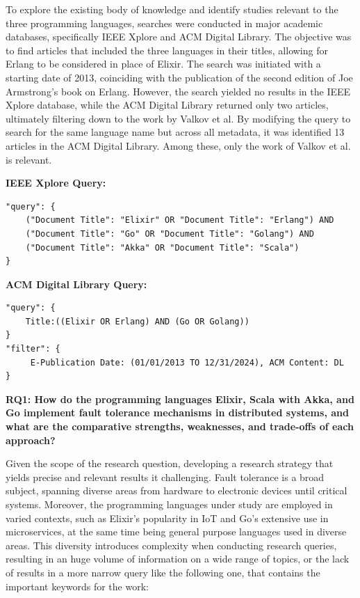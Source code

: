 To explore the existing body of knowledge and identify studies relevant to the three programming languages, searches were conducted in major academic databases, specifically IEEE Xplore and ACM Digital Library. The objective was to find articles that included the three languages in their titles, allowing for Erlang to be considered in place of Elixir. The search was initiated with a starting date of 2013, coinciding with the publication of the second edition of Joe Armstrong's book on Erlang. However, the search yielded no results in the IEEE Xplore database, while the ACM Digital Library returned only two articles, ultimately filtering down to the work by Valkov et al. By modifying the query to search for the same language name but across all metadata, it was identified 13 articles in the ACM Digital Library. Among these, only the work of Valkov et al. \cite{Valkov2018} is relevant.

\textbf{IEEE Xplore Query:}
\begin{verbatim}
"query": { 
    ("Document Title": "Elixir" OR "Document Title": "Erlang") AND
    ("Document Title": "Go" OR "Document Title": "Golang") AND 
    ("Document Title": "Akka" OR "Document Title": "Scala") 
}
\end{verbatim}


\textbf{ACM Digital Library Query:}
\begin{verbatim}
"query": { 
    Title:((Elixir OR Erlang) AND (Go OR Golang)) 
}
"filter": {
     E-Publication Date: (01/01/2013 TO 12/31/2024), ACM Content: DL 
}
\end{verbatim}


\textbf{RQ1: How do the programming languages Elixir, Scala with Akka, and Go implement fault tolerance mechanisms in distributed systems, and what are the comparative
    strengths, weaknesses, and trade-offs of each approach?}

Given the scope of the research question, developing a research strategy that yields precise and relevant results it challenging. Fault tolerance is a broad subject, spanning diverse areas from hardware to electronic devices until critical systems. Moreover, the programming languages under study are employed in varied contexts, such as Elixir’s popularity in \gls{IoT} and Go’s extensive use in microservices, at the same time being general purpose languages used in diverse areas. This diversity introduces complexity when conducting research queries, resulting in an huge volume of information on a wide range of topics, or the lack of results in a more narrow query like the following one, that contains the important keywords for the work:

